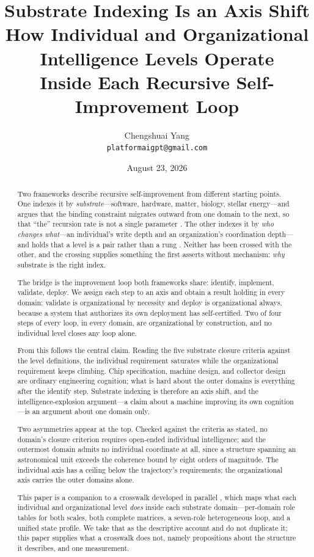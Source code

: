 \documentclass[11pt]{article}
\title{\LARGE Substrate Indexing Is an Axis Shift\\[6pt]
\large How Individual and Organizational Intelligence Levels Operate\\
Inside Each Recursive Self-Improvement Loop}
\author{Chengshuai Yang\\
\small\texttt{platformaigpt@gmail.com}}
\date{August 23, 2026}
\begin{document}
\maketitle

\begin{abstract}
Two frameworks describe recursive self-improvement from different starting points. One indexes it by \emph{substrate}---software, hardware, matter, biology, stellar energy---and argues that the binding constraint migrates outward from one domain to the next, so that ``the'' recursion rate is not a single parameter \citep{yang2026sarsil}. The other indexes it by \emph{who changes what}---an individual's write depth and an organization's coordination depth---and holds that a level is a pair rather than a rung \citep{yang2026twoaxisv2}. Neither has been crossed with the other, and the crossing supplies something the first asserts without mechanism: \emph{why} substrate is the right index.

The bridge is the improvement loop both frameworks share: identify, implement, validate, deploy. We assign each step to an axis and obtain a result holding in every domain: validate is organizational by necessity and deploy is organizational always, because a system that authorizes its own deployment has self-certified. Two of four steps of every loop, in every domain, are organizational by construction, and no individual level closes any loop alone.

From this follows the central claim. Reading the five substrate closure criteria against the level definitions, the individual requirement saturates while the organizational requirement keeps climbing. Chip specification, machine design, and collector design are ordinary engineering cognition; what is hard about the outer domains is everything after the identify step. Substrate indexing is therefore an axis shift, and the intelligence-explosion argument---a claim about a machine improving its own cognition---is an argument about one domain only.

Two asymmetries appear at the top. Checked against the criteria as stated, no domain's closure criterion requires open-ended individual intelligence; and the outermost domain admits no individual coordinate at all, since a structure spanning an astronomical unit exceeds the coherence bound by eight orders of magnitude. The individual axis has a ceiling below the trajectory's requirements; the organizational axis carries the outer domains alone.

This paper is a companion to a crosswalk developed in parallel \citep{yang2026circles}, which maps what each individual and organizational level \emph{does} inside each substrate domain---per-domain role tables for both scales, both complete matrices, a seven-role heterogeneous loop, and a unified state profile. We take that as the descriptive account and do not duplicate it; this paper supplies what a crosswalk does not, namely propositions about the structure it describes, and one measurement.


\end{abstract}
\end{document}
